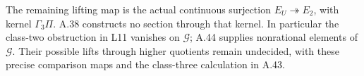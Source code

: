 The remaining lifting map is the actual continuous surjection
$E_U\twoheadrightarrow E_2$, with kernel $\Gamma_3\Pi$.
A.38 constructs no section through that kernel.  In particular
the class-two obstruction in L11 vanishes on $\mathcal G$;
A.44 supplies nonrational elements of $\mathcal G$. Their possible
lifts through higher quotients remain undecided, with these precise
comparison maps and the class-three calculation in A.43.
